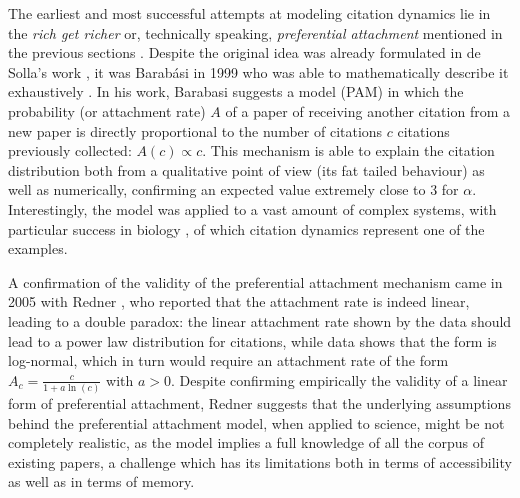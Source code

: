 The earliest and most successful attempts at modeling citation dynamics lie in the \textit{rich get richer} or, technically speaking, \textit{preferential attachment} mentioned in the previous sections . Despite the original idea was already
formulated in de Solla's work \cite{deSollaPrice510}, it was Barab{\'a}si in 1999 who was able to mathematically describe it exhaustively \cite{Barabasi509}.
In his work, Barabasi suggests a model (PAM) in which the probability (or attachment rate)
$A$ of a paper  of receiving another citation from a new paper is directly proportional to the number of citations $c$ citations previously collected: $A (c) \propto c$.
This mechanism is able to explain
the citation distribution both from a qualitative point of view (its fat tailed behaviour) as well as numerically, confirming an expected value extremely close to 3 for $\alpha$. 
Interestingly, the model was applied to a vast amount of complex systems, with particular success in biology \cite{Barabasi2004,Jeong2000}, of which citation dynamics represent one of the examples.

A confirmation of the validity of the preferential attachment mechanism came in 2005 with Redner \cite{RednerStatistics}, who reported that the attachment rate is indeed linear, leading to a double paradox: the linear attachment rate 
shown by the data should lead to a power law distribution for citations, while data shows that the form is log-normal, which in turn would require an attachment rate of the form
$A_{c} = \frac{c}{1 + a \ln(c)}$ with $a > 0$. Despite confirming empirically the validity of a linear form of preferential attachment, Redner suggests that the underlying assumptions
behind the preferential attachment model, when applied to science, might be not completely realistic, as the model implies a full knowledge of all the corpus of existing papers, a
challenge which has its limitations both in terms of accessibility as well as in terms of memory. 


